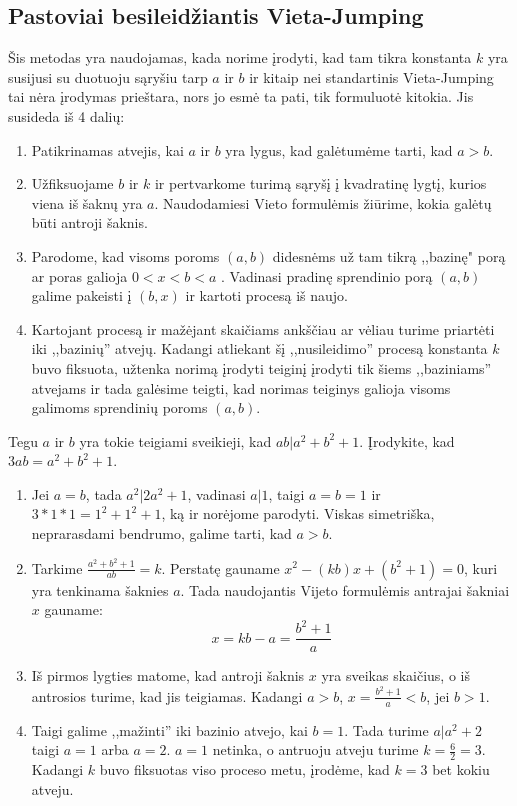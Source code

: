 \subsection{Pastoviai besileidžiantis Vieta-Jumping}
Šis metodas yra naudojamas, kada norime įrodyti, kad tam tikra konstanta $k$ yra susijusi su duotuoju sąryšiu tarp $a$ ir $b$ ir kitaip nei standartinis Vieta-Jumping tai nėra įrodymas prieštara, nors jo esmė ta pati, tik formuluotė kitokia. Jis susideda iš 4 dalių:
\begin{enumerate}
\item Patikrinamas atvejis, kai $a$ ir $b$ yra lygus, kad galėtumėme tarti, kad $a>b$.
\item Užfiksuojame $b$ ir $k$ ir pertvarkome turimą sąryšį į kvadratinę lygtį, kurios viena iš šaknų yra $a$. Naudodamiesi Vieto formulėmis žiūrime, kokia galėtų būti antroji šaknis.
\item Parodome, kad visoms poroms $(a,b)$ didesnėms už tam tikrą ,,bazinę" porą ar poras galioja $0<x<b<a$ . Vadinasi pradinę sprendinio porą $(a,b)$ galime pakeisti į $(b,x)$ ir kartoti procesą iš naujo.
\item Kartojant procesą ir mažėjant skaičiams ankščiau ar vėliau turime priartėti iki ,,bazinių'' atvejų. Kadangi atliekant šį ,,nusileidimo'' procesą konstanta $k$ buvo fiksuota, užtenka norimą įrodyti teiginį įrodyti tik šiems ,,baziniams'' atvejams ir tada galėsime teigti, kad norimas teiginys galioja visoms galimoms sprendinių poroms $(a,b)$.
\end{enumerate}
\begin{pavnr}
Tegu $a$ ir $b$ yra tokie teigiami sveikieji, kad $ab|a^2+b^2+1$. Įrodykite, kad $3ab=a^2+b^2+1$.
\end{pavnr}
\begin{sprendimas}
\begin{enumerate}
\item Jei $a=b$, tada $a^2|2a^2+1$, vadinasi $a|1$, taigi $a=b=1$ ir $3*1*1=1^2+1^2+1$, ką ir norėjome parodyti. Viskas simetriška, neprarasdami bendrumo, galime tarti, kad $a>b$.
\item Tarkime $\frac{a^2+b^2+1}{ab}=k$. Perstatę gauname $x^2-(kb)x+(b^2+1)=0$, kuri yra tenkinama šaknies $a$. Tada naudojantis Vijeto formulėmis antrajai šakniai $x$ gauname: $$x=kb-a=\frac{b^2+1}{a}$$
\item Iš pirmos lygties matome, kad antroji šaknis $x$ yra sveikas skaičius, o iš antrosios turime, kad jis teigiamas. Kadangi $a>b$, $x=\frac{b^2+1}{a}<b$, jei $b>1$.
\item Taigi galime ,,mažinti'' iki bazinio atvejo, kai $b=1$. Tada turime $a|a^2+2$ taigi $a=1$ arba $a=2$. $a=1$ netinka, o antruoju atveju turime $k=\frac{6}{2}=3$. Kadangi $k$ buvo fiksuotas viso proceso metu, įrodėme, kad $k=3$ bet kokiu atveju.
\end{enumerate}
\end{sprendimas}

